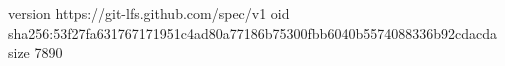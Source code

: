 version https://git-lfs.github.com/spec/v1
oid sha256:53f27fa631767171951c4ad80a77186b75300fbb6040b5574088336b92cdacda
size 7890
